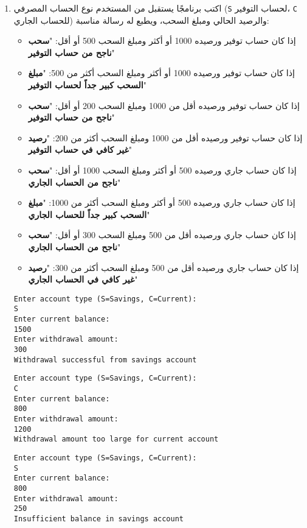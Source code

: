 \documentclass[12pt]{article}
\begin{document}
\begin{enumerate}[itemsep=3em]
\begin{enumerate}[itemsep=3em]
\begin{enumerate}
\item
اكتب برنامجًا يستقبل من المستخدم نوع الحساب المصرفي (\texttt{S} لحساب التوفير، \texttt{C} للحساب الجاري) والرصيد الحالي ومبلغ السحب، ويطبع له رسالة مناسبة:
\begin{itemize}
\item إذا كان حساب توفير ورصيده 1000 أو أكثر ومبلغ السحب 500 أو أقل: "\textbf{سحب ناجح من حساب التوفير}"
\item إذا كان حساب توفير ورصيده 1000 أو أكثر ومبلغ السحب أكثر من 500: "\textbf{مبلغ السحب كبير جداً لحساب التوفير}"
\item إذا كان حساب توفير ورصيده أقل من 1000 ومبلغ السحب 200 أو أقل: "\textbf{سحب ناجح من حساب التوفير}"
\item إذا كان حساب توفير ورصيده أقل من 1000 ومبلغ السحب أكثر من 200: "\textbf{رصيد غير كافي في حساب التوفير}"
\item إذا كان حساب جاري ورصيده 500 أو أكثر ومبلغ السحب 1000 أو أقل: "\textbf{سحب ناجح من الحساب الجاري}"
\item إذا كان حساب جاري ورصيده 500 أو أكثر ومبلغ السحب أكثر من 1000: "\textbf{مبلغ السحب كبير جداً للحساب الجاري}"
\item إذا كان حساب جاري ورصيده أقل من 500 ومبلغ السحب 300 أو أقل: "\textbf{سحب ناجح من الحساب الجاري}"
\item إذا كان حساب جاري ورصيده أقل من 500 ومبلغ السحب أكثر من 300: "\textbf{رصيد غير كافي في الحساب الجاري}"
\end{itemize}
\ifdetailed
\begin{example}[1]
\begin{english}
\begin{lstlisting}
Enter account type (S=Savings, C=Current):
S
Enter current balance:
1500
Enter withdrawal amount:
300
Withdrawal successful from savings account
\end{lstlisting}
\end{english}
\end{example}
\begin{example}[2]
\begin{english}
\begin{lstlisting}
Enter account type (S=Savings, C=Current):
C
Enter current balance:
800
Enter withdrawal amount:
1200
Withdrawal amount too large for current account
\end{lstlisting}
\end{english}
\end{example}
\begin{example}[3]
\begin{english}
\begin{lstlisting}
Enter account type (S=Savings, C=Current):
S
Enter current balance:
800
Enter withdrawal amount:
250
Insufficient balance in savings account
\end{lstlisting}
\end{english}
\end{example}


\end{enumerate}
\end{enumerate}
\end{enumerate}
\end{document}
